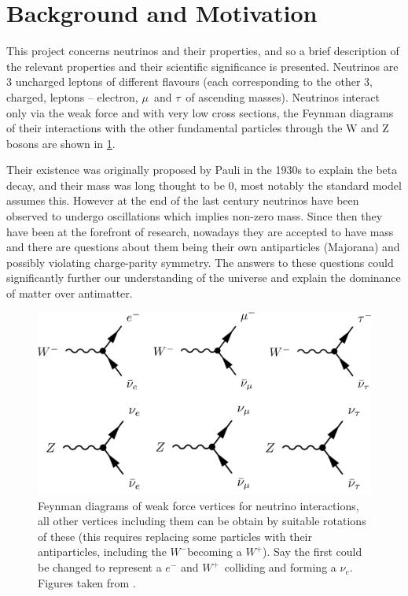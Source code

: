 \documentclass[a4paper,12pt]{article}
\newcommand{\Mu}{$\mu$}
\newcommand{\Tau}{$\tau$}
\newcommand{\Ne}{$\nu_e$}
\newcommand{\Wp}{$W^+$}
\newcommand{\Wm}{$W^-$}
\begin{document}
\pagestyle{plain}
\setcounter{page}{1}

\section{Background and Motivation}
This project concerns neutrinos and their properties, and so a brief description of the relevant properties and their scientific significance is presented.
Neutrinos are 3 uncharged leptons of different flavours (each corresponding to the other 3, charged, leptons -- electron, \Mu\ and \Tau\ of ascending masses).
Neutrinos interact only via the weak force and with very low cross sections, the Feynman diagrams of their interactions with the other fundamental particles through the W and Z bosons are shown in \cref{fig:nu_feyn}.

Their existence was originally proposed by Pauli in the 1930s to explain the beta decay, and their mass was long thought to be 0, most notably the standard model assumes this.
However at the end of the last century neutrinos have been observed to undergo oscillations which implies non-zero mass.
Since then they have been at the forefront of research, nowadays they are accepted to have mass and there are questions about them being their own antiparticles (Majorana) and possibly violating charge-parity symmetry.
The answers to these questions could significantly further our understanding of the universe and explain the dominance of matter over antimatter.

\begin{figure}[h]
    \centering
    \includegraphics{figures/NeutrinoFeynman.jpg}
    \caption{
        Feynman diagrams of weak force vertices for neutrino interactions, all other vertices including them can be obtain by suitable rotations of these
        (this requires replacing some particles with their antiparticles, including the \Wm becoming a \Wp).
        Say the first could be changed to represent a $e^-$ and \Wp\ colliding and forming a \Ne.
        Figures taken from \cite{potterFeynmanDiagramsParticlea}.
    }\label{fig:nu_feyn}
\end{figure}
\end{document}
